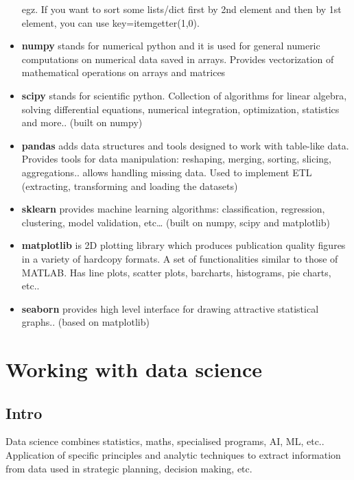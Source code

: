 \documentclass[
  letterpaper,
  DIV=11,
  numbers=noendperiod]{scrreprt}
\begin{document}
\begin{itemize}
  egz. If you want to sort some lists/dict first by 2nd element and then
  by 1st element, you can use key=itemgetter(1,0).
\item
  \textbf{numpy} stands for numerical python and it is used for general
  numeric computations on numerical data saved in arrays. Provides
  vectorization of mathematical operations on arrays and matrices
\item
  \textbf{scipy} stands for scientific python. Collection of algorithms
  for linear algebra, solving differential equations, numerical
  integration, optimization, statistics and more.. (built on numpy)
\item
  \textbf{pandas} adds data structures and tools designed to work with
  table-like data. Provides tools for data manipulation: reshaping,
  merging, sorting, slicing, aggregations.. allows handling missing
  data. Used to implement ETL (extracting, transforming and loading the
  datasets)
\item
  \textbf{sklearn} provides machine learning algorithms: classification,
  regression, clustering, model validation, etc\ldots{} (built on numpy,
  scipy and matplotlib)
\item
  \textbf{matplotlib} is 2D plotting library which produces publication
  quality figures in a variety of hardcopy formats. A set of
  functionalities similar to those of MATLAB. Has line plots, scatter
  plots, barcharts, histograms, pie charts, etc..
\item
  \textbf{seaborn} provides high level interface for drawing attractive
  statistical graphs.. (based on matplotlib)
\end{itemize}


\hypertarget{working-with-data-science}{%
\chapter{Working with data science}\label{working-with-data-science}}

\hypertarget{intro-1}{%
\section{Intro}\label{intro-1}}

Data science combines statistics, maths, specialised programs, AI, ML,
etc.. Application of specific principles and analytic techniques to
extract information from data used in strategic planning, decision
making, etc.
\end{document}
